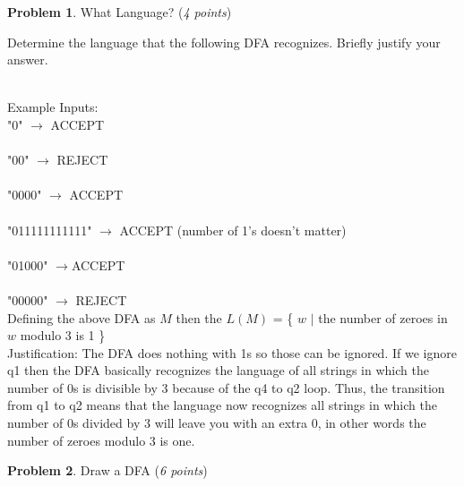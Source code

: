 \documentclass[11pt]{article}
\theoremstyle{definition}
\theoremstyle{theorem}
\newtheorem{prob}{Problem}
\newcommand{\solution}{\medskip\noindent{\color{blue}\textbf{Solution:}}}
\begin{document}
\newpage

\begin{prob} What Language? (\emph{4 points})\end{prob}

Determine the language that the following DFA recognizes. Briefly justify your answer.


\solution
\\Example Inputs:\\
"0" $\rightarrow$ ACCEPT \\\\
"00" $\rightarrow$ REJECT \\\\
"0000" $\rightarrow$ ACCEPT \\\\
"011111111111" $\rightarrow$ ACCEPT (number of 1's doesn't matter) \\\\
"01000" $\rightarrow$ACCEPT \\\\
"00000" $\rightarrow$ REJECT \\

\noindent Defining the above DFA as $M$ then the $L(M)$ = \{ $w$ $|$ the number of zeroes in $w$ modulo 3 is 1 \} \\

\noindent Justification: The DFA does nothing with 1s so those can be ignored. If we ignore q1 then the DFA basically recognizes the language of all strings in which the number of 0s is divisible by 3 because of the q4 to q2 loop. Thus, the transition from q1 to q2 means that the language now recognizes all strings in which the number of 0s divided by 3 will leave you with an extra 0, in other words the number of zeroes modulo 3 is one.

\newpage

\begin{prob} Draw a DFA (\emph{6 points})\end{prob}
\end{document}
